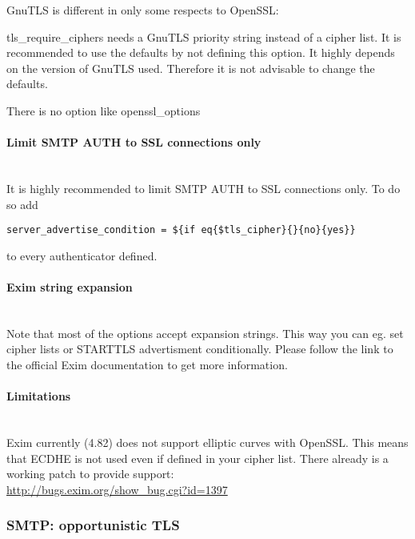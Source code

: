 GnuTLS is different in only some respects to OpenSSL:
\begin{list}{•}{•}
\item tls\_require\_ciphers needs a GnuTLS priority string instead of a cipher list. It is recommended to use the defaults by not defining this option. It highly depends on the version of GnuTLS used. Therefore it is not advisable to change the defaults.
\item There is no option like openssl\_options
\end{list}

\paragraph*{Limit SMTP AUTH to SSL connections only}\mbox{}\\

It is highly recommended to limit SMTP AUTH to SSL connections only. To do so add
\begin{lstlisting}[breaklines]
  server_advertise_condition = ${if eq{$tls_cipher}{}{no}{yes}}
\end{lstlisting}
to every authenticator defined.

\paragraph*{Exim string expansion}\mbox{}\\

Note that most of the options accept expansion strings. This way you can eg. set cipher lists or STARTTLS advertisment conditionally. Please follow the link to the official Exim documentation to get more information.

\paragraph*{Limitations}\mbox{}\\

Exim currently (4.82) does not support elliptic curves with OpenSSL. This means that ECDHE is not used even if defined in your cipher list.
There already is a working patch to provide support:\\
\url{http://bugs.exim.org/show_bug.cgi?id=1397}

\subsubsection{SMTP: opportunistic TLS}

